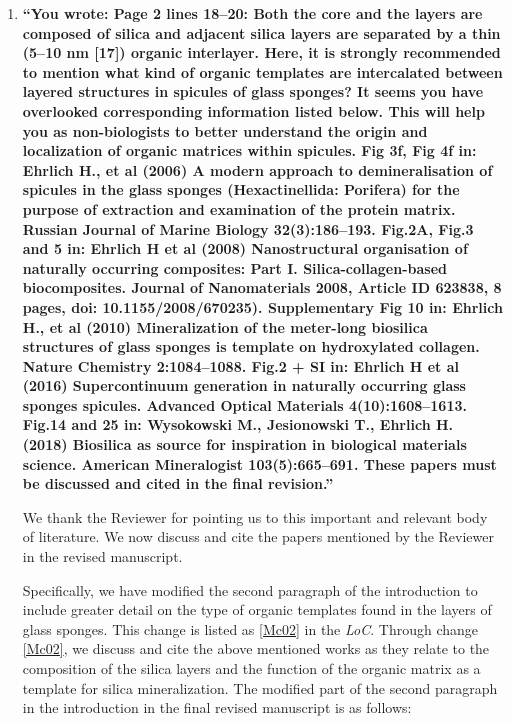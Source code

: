 \documentclass[11pt,letterpaper]{report}
\begin{document}
\begin{enumerate}[label=\textit{1.\arabic*},wide, labelwidth=!, labelindent=0pt]
\item \label{r4c3} {\bf ``You wrote: Page 2 lines 18--20: Both the core and the layers are composed of silica and adjacent silica layers are separated by a thin (5--10 nm [17]) organic interlayer.
Here, it is strongly recommended to mention what kind of organic templates are intercalated between layered structures in spicules of glass sponges? It seems you have overlooked corresponding information listed below. This will help you as non-biologists to better understand the origin and localization of organic matrices within spicules.
%
Fig 3f, Fig 4f in: Ehrlich H., et al (2006) A modern approach to demineralisation of spicules in the glass sponges (Hexactinellida: Porifera) for the purpose of extraction and examination of the protein matrix. Russian Journal of Marine Biology 32(3):186--193.
%
Fig.2A, Fig.3 and 5 in: Ehrlich H et al (2008) Nanostructural organisation of naturally occurring composites: Part I. Silica-collagen-based biocomposites. Journal of Nanomaterials 2008, Article ID 623838, 8 pages, doi: 10.1155/2008/670235).
%
Supplementary Fig 10 in: Ehrlich H., et al (2010) Mineralization of the meter-long biosilica structures of glass sponges is template on hydroxylated collagen. Nature Chemistry 2:1084--1088.
%
Fig.2 + SI in: Ehrlich H et al (2016) Supercontinuum generation in naturally occurring glass sponges spicules. Advanced Optical Materials 4(10):1608--1613.
%
Fig.14 and 25 in: Wysokowski M., Jesionowski T., Ehrlich H. (2018) Biosilica as source for inspiration in biological materials science. American Mineralogist 103(5):665--691.
%
These papers must be discussed and cited in the final revision.''}

We thank the Reviewer for pointing us to this important and relevant body of literature. We now discuss and cite the papers mentioned by the Reviewer in the revised manuscript.

Specifically, we have modified the second paragraph of the introduction to include greater detail on the type of organic templates found in the layers of glass sponges. This change is listed as  \ref{Mc02} in the \textit{LoC}.  Through change \ref{Mc02}, we  discuss and cite the above mentioned works as they relate to the composition of the silica layers and the function of the organic matrix as a template for silica mineralization.
%
%
The modified part of  the second paragraph in the introduction in the final revised manuscript is as follows:


\end{enumerate}
\end{document}
